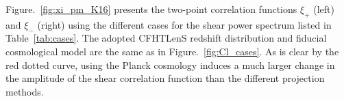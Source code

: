 \documentclass[fleqn,usenatbib]{mnras} %
\begin{document}
Figure.~\ref{fig:xi_pm_K16} presents the two-point correlation functions
$\xi_+$ (left) and $\xi_-$ (right) using the different cases for the shear
power spectrum listed in Table~\ref{tab:cases}. The adopted CFHTLenS redshift
distribution and fiducial cosmological model are the same as in
Figure.~\ref{fig:Cl_cases}. As is clear by the red dotted curve, using the
Planck cosmology \citep{2015arXiv150201589P} induces a much larger change in
the amplitude of the shear correlation function than the different projection
methods.


\begin{figure}

  \begin{center}


\end{center}
\end{figure}
\end{document}
